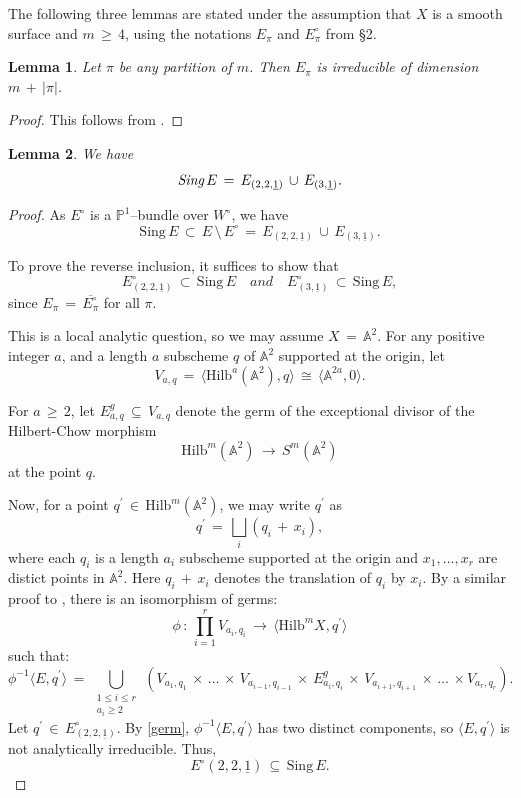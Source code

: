 \documentclass[12pt,reqno]{amsart}
\newtheorem{lemma}{Lemma}[section]
\theoremstyle{definition}
\numberwithin{equation}{section}
\begin{document}
The following three lemmas are stated under the assumption that $X$ is a smooth surface and $m\,\geq\, 4$, using the notations $E_{\pi}$ and $E_{\pi}^{\circ}$ from \S2.
\begin{lemma}\label{local}
Let $\pi$ be any partition of $m$. Then $E_{\pi}$ is  irreducible of dimension $m\,+\,|\pi|$.    
\end{lemma}
\begin{proof}
This follows from \cite[Section 3.6]{DMM}.    
\end{proof}
\begin{lemma}\label{Sing}
We have
$$\emph{Sing}\, E\,=\,E_{(2,2,\underline{1})}\,\cup\,E_{(3,\underline{1})}.$$
\end{lemma}
\begin{proof}
As $E^{\circ}$ is a $\mathbb{P}^{1}$--bundle over $W^{\circ}$, we have 
$$\textrm{Sing}\,E\,\subset\, E\,\setminus\,E^{\circ}\,=\, E_{(2, 2, \underline{1})}\,\cup\, E_{(3,\underline{1})}.$$

To prove the reverse inclusion, it suffices to show that 
$$E^{\circ}_{(2,2,\underline{1})}\,\subset\, \textrm{Sing}\,E \quad and \quad E^{\circ}_{(3,\underline{1})}\,\subset\, \textrm{Sing}\,E,$$
since $E_{\pi}\,=\, \overline{E_{\pi}^{\circ}}$ for all $\pi$.

This is a local analytic question, so we may assume $X\,=\, \mathbb{A}^{2}$. For any positive integer $a$, and a length $a$ subscheme $q$ of $\mathbb{A}^{2}$ supported at the origin, let 
$$V_{a,q}\,=\,\langle \textrm{Hilb}^{a}(\mathbb{A}^{2}), q \rangle\,\cong\, \langle\mathbb{A}^{2a},0 \rangle.$$

For $a\,\geq\, 2$, let  $E^{g}_{a, q}\,\subseteq\, V_{a,q}$ denote the germ of the exceptional divisor of the Hilbert-Chow morphism
$$\textrm{Hilb}^{m}(\mathbb{A}^{2})\,\to\, S^m (\mathbb{A}^{2})$$
at the point $q$. 

Now, for a point $q^{\prime}\,\in\, \textrm{Hilb}^{m}(\mathbb{A}^{2})$, we may write $q^{\prime}$ as
$$q^{\prime}\,=\, \bigsqcup_{i}(q_{i}\,+\, x_{i}),$$
where each $q_{i}$ is a length $a_{i}$ subscheme supported  at the origin and $x_{1},\ldots, x_{r}$ are distict points in $\mathbb{A}^{2}$. Here $q_{i}\,
+\,x_{i}$ denotes the translation of $q_{i}$ by $x_{i}$. By a similar proof to {\cite[Lemma 2.2]{BSV3}}, there is an isomorphism of germs:
\begin{equation}\label{germ}
\phi\,:\,\prod_{i=1}^{r}V_{a_{i}, q_{i}}\,\longrightarrow\, \langle\textrm{Hilb}^{m}X, q^{\prime} \rangle   
\end{equation}
such that:
\begin{equation*}
\phi^{-1}\langle E,q^{\prime} \rangle\,=\,\bigcup_{\substack{1 \leq i \leq r \\ a_i \geq 2}}\,(V_{a_{1}, q_{1}}\,\times\, \ldots\, \times\, V_{a_{i-1}, q_{i-1}}\,\times\, E^{g}_{a_{i},q_{i}} \,\times\, V_{a_{i+1}, q_{i+1}} \,\times\,\ldots\,\times V_{a_{r},q_{r}}).    
\end{equation*}
Let $q^{\prime}\,\in\, E^{\circ}_{(2,2,\underline{1})}$. By \eqref{germ}, $\phi^{-1}\langle E, q^{\prime} \rangle$ has two distinct components, so $\langle E, q^{\prime} \rangle$ is not analytically irreducible. Thus, 
$$E^{\circ}(2,2, \underline{1})\,\subseteq\, \textrm{Sing}\,E.$$ 


\end{proof}
\end{document}
